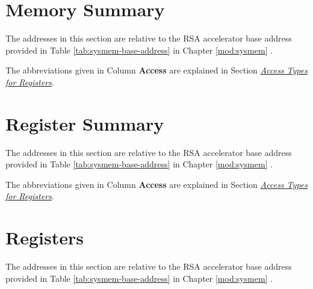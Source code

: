 \documentclass[main\_\_EN.tex]{subfiles}
\begin{document}
\section{ Memory Summary}\label{sec:mem-sum}
The addresses in this section are relative to the RSA accelerator base address provided in Table \ref{tab:sysmem-base-address} in Chapter \ref{mod:sysmem} \textit{}.

The abbreviations given in Column \textbf{Access} are explained in Section \hyperref[glossary-access-types]{\textit{Access Types for Registers}}.



\section{ Register Summary }\hypertarget{rsa-reg-summ}{}
The addresses in this section are relative to the RSA accelerator base address provided in Table \ref{tab:sysmem-base-address} in Chapter \ref{mod:sysmem} \textit{}.

The abbreviations given in Column \textbf{Access} are explained in Section \hyperref[glossary-access-types]{\textit{Access Types for Registers}}.




\section{ Registers }

The addresses in this section are relative to the RSA accelerator base address provided in Table \ref{tab:sysmem-base-address} in Chapter \ref{mod:sysmem} \textit{}.


\end{document}
